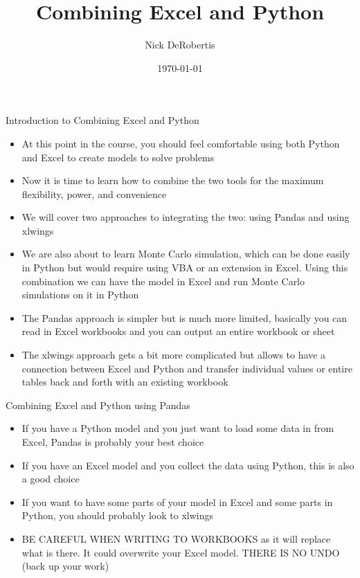 \documentclass[]{article}
\begin{document}
\title{Combining Excel and Python}
\author{Nick DeRobertis}
\date{\today}
\maketitle
\begin{section}{Introduction to Combining Excel and Python}
\begin{itemize}
\item At this point in the course, you should feel comfortable using both Python and Excel to create models to solve problems
\item Now it is time to learn how to combine the two tools for the maximum flexibility, power, and convenience
\item We will cover two approaches to integrating the two: using Pandas and using xlwings
\item We are also about to learn Monte Carlo simulation, which can be done easily in Python but would require using VBA or an extension in Excel. Using this combination we can have the model in Excel and run Monte Carlo simulations on it in Python
\item The Pandas approach is simpler but is much more limited, basically you can read in Excel workbooks and you can output an entire workbook or sheet
\item The xlwings approach gets a bit more complicated but allows to have a connection between Excel and Python and transfer individual values or entire tables back and forth with an existing workbook
\end{itemize}
\end{section}
\begin{section}{Combining Excel and Python using Pandas}
\begin{itemize}
\item If you have a Python model and you just want to load some data in from Excel, Pandas is probably your best choice
\item If you have an Excel model and you collect the data using Python, this is also a good choice
\item If you want to have some parts of your model in Excel and some parts in Python, you should probably look to xlwings
\item BE CAREFUL WHEN WRITING TO WORKBOOKS as it will replace what is there. It could overwrite your Excel model. THERE IS NO UNDO (back up your work)
\end{itemize}
\end{section}
\end{document}
